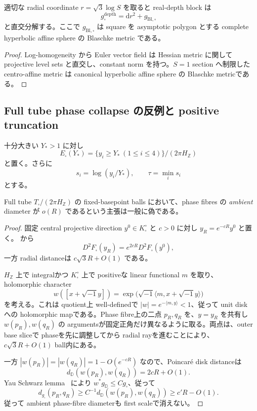 \documentclass[11pt,a4paper]{ltjsarticle}
\newcommand{\ZZ}{\mathbb Z}\newcommand{\dd}{\mathrm d}\newcommand{\Ric}{\operatorname{Ric}}
\newcommand{\gsq}{g_{\square}}\newcommand{\omsq}{\omega_{\square}}
\newcommand{\Fbox}{F_{\square}}\newcommand{\ddc}{\sqrt{-1}\,\partial\bar\partial}
\theoremstyle{plain}
\theoremstyle{definition}
\theoremstyle{remark}
\begin{document}
\begin{proposition}\label{prop:radial-splitting}
適切な radial coordinate $r=\sqrt3\log S$ を取ると real-depth block は
\[
 \gsq^{\mathrm{depth}}=\dd r^2+g_{\mathrm{Bl},\square}
\]
と直交分解する。ここで $g_{\mathrm{Bl},\square}$ は square を asymptotic polygon とする complete hyperbolic affine sphere の Blaschke metric である。
\end{proposition}

\begin{proof}
Log-homogeneity から Euler vector field は Hessian metric に関して projective level sets と直交し、constant norm を持つ。$S=1$ section へ制限した centro-affine metric は canonical hyperbolic affine sphere の Blaschke metricである。
\end{proof}

\subsection{Full tube phase collapse の反例と positive truncation}
十分大きい $Y_*>1$ に対し
\begin{equation}\label{eq:positive-truncated-end}
 E_{\square}(Y_*)
 =\{y_i\ge Y_*\ (1\le i\le4)\}/(2\pi H_{\ZZ})
\end{equation}
と置く。さらに
\[
 s_i=\log(y_i/Y_*),
 \qquad
 \tau=\min_i s_i
\]
とする。

\begin{proposition}\label{prop:full-phase-false}
Full tube $T_{\square}/(2\pi H_{\ZZ})$ の fixed-basepoint balls において、phase fibres の \emph{ambient} diameter が $o(R)$ であるという主張は一般に偽である。
\end{proposition}

\begin{proof}
固定 central projective direction $y^0\in K_{\square}^{\circ}$ と $c>0$ に対し $y_R=e^{-cR}y^0$ と置く。 から
\[
 D^2\Fbox(y_R)=e^{2cR}D^2\Fbox(y^0),
\]
一方 radial distanceは $c\sqrt3R+O(1)$ である。

$H_{\ZZ}$ 上で integralかつ $K_{\square}^{\circ}$ 上で positiveな linear functional $m$ を取り、holomorphic character
\[
 w([x+\sqrt{-1}y])=\exp\bigl(\sqrt{-1}\langle m,x+\sqrt{-1}y\rangle\bigr)
\]
を考える。これは quotient上 well-definedで $|w|=e^{-\langle m,y\rangle}<1$、従って unit diskへの holomorphic mapである。Phase fibre上の二点 $p_R,q_R$ を、$y=y_R$ を共有し $w(p_R),w(q_R)$ の argumentsが固定正角だけ異なるように取る。両点は、outer base sliceで phaseを先に調整してから radial rayを進むことにより、$c\sqrt3R+O(1)$ ball内にある。

一方 $|w(p_R)|=|w(q_R)|=1-O(e^{-cR})$ なので、Poincar\'e disk distanceは
\[
 d_{\mathbb D}(w(p_R),w(q_R))=2cR+O(1).
\]
Yau Schwarz lemma~\cite{YauSchwarz} により $w^*g_{\mathbb D}\le C\gsq$、従って
\[
 d_{\gsq}(p_R,q_R)\ge C^{-1}d_{\mathbb D}(w(p_R),w(q_R))\ge c'R-O(1).
\]
従って ambient phase-fibre diameterも first scaleで消えない。
\end{proof}
\end{document}
